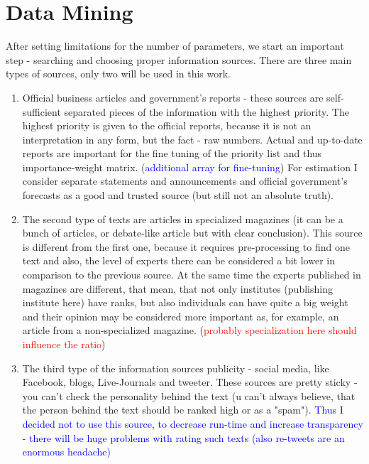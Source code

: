 \documentclass[11pt]{article}
\begin{document}
\section{Data Mining}
After setting limitations for the number of parameters, we start an important step - searching and choosing proper information sources. 
There are three main types of sources, only two will be used in this work.\\
\begin{enumerate}
	\item Official business articles and government's reports - these sources are self-sufficient separated pieces of the information with the highest priority. The highest priority is given to the official reports, because it is not an interpretation in any form, but the fact - raw numbers. Actual and up-to-date reports are important for the fine tuning of the priority list and thus importance-weight matrix. (\textcolor{blue}{additional array for fine-tuning}) For estimation I consider separate statements and announcements and official government's forecasts as a good and trusted source (but still not an absolute truth).\\
	 \item The second type of texts are articles in specialized magazines (it can be a bunch of articles, or debate-like article but with clear conclusion). This source is different from the first one, because it requires pre-processing to find one text and also, the level of experts there can be considered a bit lower in comparison to the previous source. At the same time the experts published in magazines are different, that mean, that not only institutes (publishing institute here) have ranks, but also individuals can have quite a big weight and their opinion may be considered more important as, for example, an article from a non-specialized magazine. (\textcolor{red}{probably specialization here should influence the ratio})
	 \item The third type of the information sources publicity - social media, like Facebook, blogs, Live-Journals and tweeter. These sources are pretty sticky - you can't check the personality behind the text (u can't always believe, that the person behind the text should be ranked high or as a "spam"). 
\textcolor{blue}{Thus I decided not to use this source, to decrease run-time and increase transparency - there will be huge problems with rating such texts (also re-tweets are an enormous headache)}	
\end{enumerate}
\end{document}
